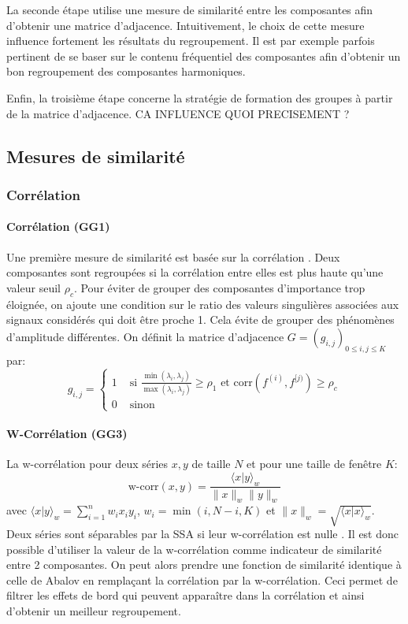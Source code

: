 \documentclass{gretsi}
\begin{document}
La seconde étape utilise une mesure de similarité entre les composantes afin d'obtenir une matrice d'adjacence. Intuitivement, le choix de cette mesure influence fortement les résultats du regroupement. Il est par exemple parfois pertinent de se  baser sur le contenu fréquentiel des composantes afin d'obtenir un bon regroupement des composantes harmoniques.

Enfin, la troisième étape concerne la stratégie de formation des groupes à partir de la matrice d'adjacence. CA INFLUENCE QUOI PRECISEMENT ?

\subsection{Mesures de similarité}
\label{sub:sim}

\subsubsection{Corrélation}

\paragraph{Corrélation (GG1)}\label{par:GG1}
    Une première mesure de similarité est basée sur la corrélation \cite{abalov_14_auto}. Deux composantes sont regroupées si la corrélation entre elles est plus haute qu'une valeur seuil $\rho_c$. Pour éviter de grouper des composantes d'importance trop éloignée, on ajoute une condition sur le ratio des valeurs singulières associées aux signaux considérés qui doit être proche 1. Cela évite de grouper des phénomènes d'amplitude différentes. On définit la matrice d'adjacence $G = (g_{i, j})_{0 \le i,j\le K}$ par:
    $$
    g_{i, j} = \begin{cases}
	    1 &\text{ si } \displaystyle\frac{\min(\lambda_i, \lambda_j)}{\max(\lambda_i, \lambda_j)} \ge \rho_1 \text{ et } \text{corr}(f^{(i)}, f^{[j)}) \ge \rho_c\\
	    0& \text{ sinon}
    \end{cases}
    $$

\paragraph{W-Corrélation (GG3)}\label{par:GG3} 
    La w-corrélation pour deux séries $x, y$ de taille $N$ et pour une taille de fenêtre $K$:
    $$
    \text{w-corr}(x, y) = \frac{\langle x|y\rangle_w}{\|x\|_w\|y\|_w}
    $$avec $\langle x|y\rangle_w = \sum_{i=1}^n w_i x_i y_i$, $w_i = \min(i, N-i, K)$ et $\|x\|_w = \sqrt{\langle x|x\rangle_w}$. Deux séries sont séparables par la SSA si leur w-corrélation est nulle \cite{GNZ_10_SSA}. Il est donc possible d'utiliser la valeur de la w-corrélation comme indicateur de similarité entre 2 composantes. On peut alors prendre une fonction de similarité identique à celle de Abalov en remplaçant la corrélation par la w-corrélation. Ceci permet de filtrer les effets de bord qui peuvent apparaître dans la corrélation et ainsi d'obtenir un meilleur regroupement.
\end{document}
